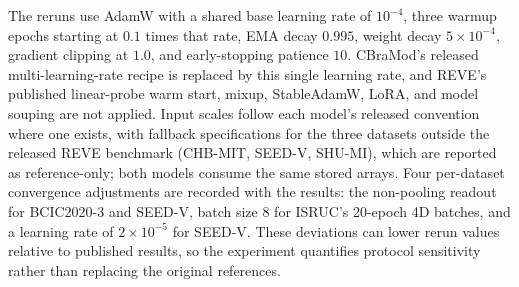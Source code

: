 The reruns use AdamW with a shared base learning rate of $10^{-4}$, three
warmup epochs starting at $0.1$ times that rate, EMA decay $0.995$, weight decay
$5\times10^{-4}$, gradient clipping at $1.0$, and early-stopping patience $10$.
CBraMod's released multi-learning-rate recipe is replaced by this single
learning rate, and REVE's published linear-probe warm start, mixup,
StableAdamW, LoRA, and model souping are not applied. Input scales follow each model's released convention where one exists,
with fallback specifications for the three datasets outside the released REVE
benchmark (CHB-MIT, SEED-V, SHU-MI), which are reported as reference-only;
both models consume the same stored arrays. Four
per-dataset convergence adjustments are recorded with the results: the
non-pooling readout for BCIC2020-3 and SEED-V, batch size 8 for ISRUC's
20-epoch 4D batches, and a learning rate of $2\times10^{-5}$ for SEED-V. These
deviations can lower rerun values relative to published results, so the
experiment quantifies protocol sensitivity rather than replacing the original
references.

